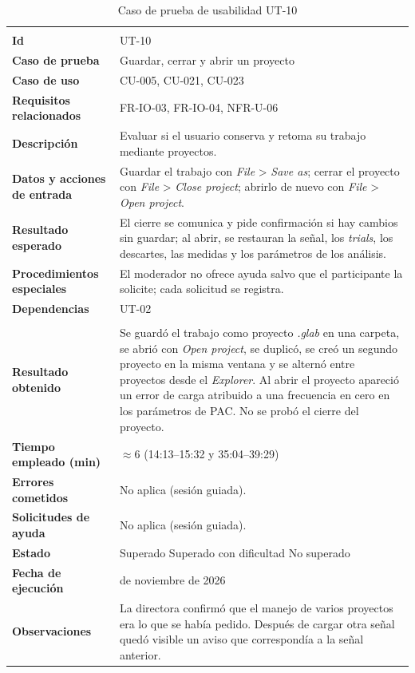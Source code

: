 \documentclass[12pt,letterpaper,oneside]{article}
\DeclareRobustCommand{\_}{\textunderscore\allowbreak}
\newcommand{\fechasesion}{11 de noviembre de 2026}
\newcommand{\casilla}[1]{%
    \fbox{\makebox[1em][c]{#1}}%
}
\begin{document}
\begin{center}
\small
\begin{longtable}{|>{\raggedright\arraybackslash}p{}|>{\raggedright\arraybackslash}p{}|}
\hline
\endfirsthead
\hline
\endhead
\hline
\endfoot
\hline
\caption{Caso de prueba de usabilidad UT-10} \label{tab:ut-10} \\
\endlastfoot
\textbf{Id} & UT-10 \\
\hline
\textbf{Caso de prueba} & Guardar, cerrar y abrir un proyecto \\
\hline
\textbf{Caso de uso} & CU-005, CU-021, CU-023 \\
\hline
\textbf{Requisitos relacionados} & FR-IO-03, FR-IO-04, NFR-U-06 \\
\hline
\textbf{Descripción} & Evaluar si el usuario conserva y retoma su trabajo mediante proyectos. \\
\hline
\textbf{Datos y acciones de entrada} & Guardar el trabajo con \textit{File} > \textit{Save as}; cerrar el proyecto con \textit{File} > \textit{Close project}; abrirlo de nuevo con \textit{File} > \textit{Open project}. \\
\hline
\textbf{Resultado esperado} & El cierre se comunica y pide confirmación si hay cambios sin guardar; al abrir, se restauran la señal, los \textit{trials}, los descartes, las medidas y los parámetros de los análisis. \\
\hline
\textbf{Procedimientos especiales} & El moderador no ofrece ayuda salvo que el participante la solicite; cada solicitud se registra. \\
\hline
\textbf{Dependencias} & UT-02 \\
\hline
\multicolumn{2}{|c|}{\textbf{Información para el seguimiento}} \\
\hline
\textbf{Resultado obtenido} & Se guardó el trabajo como proyecto \textit{.glab} en una carpeta, se abrió con \textit{Open project}, se duplicó, se creó un segundo proyecto en la misma ventana y se alternó entre proyectos desde el \textit{Explorer}. Al abrir el proyecto apareció un error de carga atribuido a una frecuencia en cero en los parámetros de PAC. No se probó el cierre del proyecto. \\
\hline
\textbf{Tiempo empleado (min)} & $\approx$6 (14:13--15:32 y 35:04--39:29) \\
\hline
\textbf{Errores cometidos} & No aplica (sesión guiada). \\
\hline
\textbf{Solicitudes de ayuda} & No aplica (sesión guiada). \\
\hline
\textbf{Estado} & \casilla{} Superado \qquad \casilla{x} Superado con dificultad \qquad \casilla{} No superado \\
\hline
\textbf{Fecha de ejecución} & \fechasesion \\
\hline
\textbf{Observaciones} & La directora confirmó que el manejo de varios proyectos era lo que se había pedido. Después de cargar otra señal quedó visible un aviso que correspondía a la señal anterior. \\
\hline
\end{longtable}
\end{center}
\end{document}
